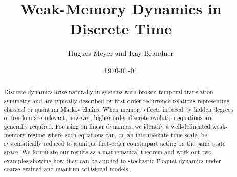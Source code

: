 \documentclass[aps,prl,reprint]{revtex4-2}
\begin{document}
\title{Weak-Memory Dynamics in Discrete Time}

\author{Hugues Meyer and Kay Brandner}


\newcommand{\sA}{\mathsf{A}}
\newcommand{\sB}{\mathsf{B}}
\newcommand{\sC}{\mathsf{C}}
\newcommand{\sD}{\mathsf{D}}
\newcommand{\sE}{\mathsf{E}}
\newcommand{\sF}{\mathsf{F}}
\newcommand{\sG}{\mathsf{G}}
\newcommand{\sH}{\mathsf{H}}
\newcommand{\sI}{\mathsf{I}}
\newcommand{\sJ}{\mathsf{J}}
\newcommand{\sK}{\mathsf{K}}
\newcommand{\sL}{\mathsf{L}}
\newcommand{\sM}{\mathsf{M}}
\newcommand{\sN}{\mathsf{N}}
\newcommand{\sO}{\mathsf{O}}
\newcommand{\sP}{\mathsf{P}}
\newcommand{\sQ}{\mathsf{Q}}
\newcommand{\sR}{\mathsf{R}}
\newcommand{\sS}{\mathsf{S}}
\newcommand{\sT}{\mathsf{T}}
\newcommand{\sU}{\mathsf{U}}
\newcommand{\sV}{\mathsf{V}}
\newcommand{\sW}{\mathsf{W}}
\newcommand{\sX}{\mathsf{X}}
\newcommand{\sY}{\mathsf{Y}}
\newcommand{\sZ}{\mathsf{Z}}

\newcommand{\mD}{\mathcal{D}}
\newcommand{\mE}{\mathcal{E}}
\newcommand{\mF}{\mathcal{F}}
\newcommand{\mG}{\mathcal{G}}
\newcommand{\mH}{\mathcal{H}}
\newcommand{\mI}{\mathcal{I}}
\newcommand{\mK}{\mathcal{K}}
\newcommand{\mQ}{\mathcal{Q}}
\newcommand{\mT}{\mathcal{T}}
\newcommand{\mU}{\mathcal{U}}
\newcommand{\mV}{\mathcal{V}}
\newcommand{\mY}{\mathcal{Y}}
\newcommand{\mZ}{\mathcal{Z}}

\newcommand{\bC}{\mathbb{C}}
\newcommand{\bN}{\mathbb{N}}
\newcommand{\bR}{\mathbb{R}}

\newcommand{\fB}{\mathfrak{B}}
\newcommand{\fT}{\mathfrak{T}}

\newcommand{\trans}{\mathsf{T}}
\newcommand{\tr}{\mathrm{Tr}}

\newcommand{\nrm}[1]{\lVert #1 \rVert}
\newcommand{\abs}[1]{\lvert #1 \rvert}
\newcommand{\ket}[1]{\lvert #1 \rangle}
\newcommand{\bra}[1]{\langle #1 \rvert}

\newcommand{\tb}[1]{\textcolor{blue}{#1}}

\date{\today}

\begin{abstract}
Discrete dynamics arise naturally in systems with broken temporal translation symmetry and are typically described by first-order recurrence relations representing classical or quantum Markov chains.
When memory effects induced by hidden degrees of freedom are relevant, however, higher-order discrete evolution equations are generally required.
Focusing on linear dynamics, we identify a well-delineated weak-memory regime where such equations can, on an intermediate time scale, be systematically reduced to a unique first-order counterpart acting on the same state space.
We formulate our results as a mathematical theorem and work out two examples showing how they can be applied to stochastic Floquet dynamics under coarse-grained and quantum collisional models.
\end{abstract}
\end{document}
